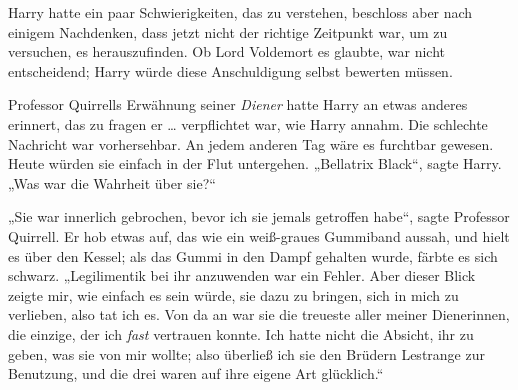 Harry hatte ein paar Schwierigkeiten, das zu verstehen, beschloss aber nach einigem Nachdenken, dass jetzt nicht der richtige Zeitpunkt war, um zu versuchen, es herauszufinden. Ob Lord Voldemort es glaubte, war nicht entscheidend; Harry würde diese Anschuldigung selbst bewerten müssen.

Professor Quirrells Erwähnung seiner \emph{Diener} hatte Harry an etwas anderes erinnert, das zu fragen er … verpflichtet war, wie Harry annahm. Die schlechte Nachricht war vorhersehbar. An jedem anderen Tag wäre es furchtbar gewesen. Heute würden sie einfach in der Flut untergehen.
„Bellatrix Black“, sagte Harry.
„Was war die Wahrheit über sie?“

„Sie war innerlich gebrochen, bevor ich sie jemals getroffen habe“, sagte Professor Quirrell. Er hob etwas auf, das wie ein weiß-graues Gummiband aussah, und hielt es über den Kessel; als das Gummi in den Dampf gehalten wurde, färbte es sich schwarz.
„Legilimentik bei ihr anzuwenden war ein Fehler. Aber dieser Blick zeigte mir, wie einfach es sein würde, sie dazu zu bringen, sich in mich zu verlieben, also tat ich es. Von da an war sie die treueste aller meiner Dienerinnen, die einzige, der ich \emph{fast} vertrauen konnte. Ich hatte nicht die Absicht, ihr zu geben, was sie von mir wollte; also überließ ich sie den Brüdern Lestrange zur Benutzung, und die drei waren auf ihre eigene Art glücklich.“

